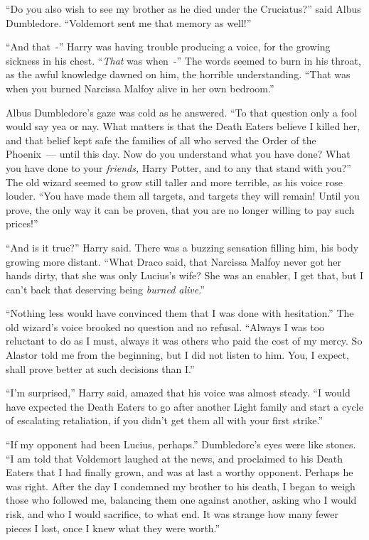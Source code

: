 ``Do you also wish to see my brother as he died under the Cruciatus?'' said Albus Dumbledore. ``Voldemort sent me that memory as well!''

``And that~-'' Harry was having trouble producing a voice, for the growing sickness in his chest. ``\emph{That} was when~-'' The words seemed to burn in his throat, as the awful knowledge dawned on him, the horrible understanding. ``That was when you burned Narcissa Malfoy alive in her own bedroom.''

Albus Dumbledore's gaze was cold as he answered. ``To that question only a fool would say yea or nay. What matters is that the Death Eaters believe I killed her, and that belief kept safe the families of all who served the Order of the Phoenix~--- until this day. Now do you understand what you have done? What you have done to your \emph{friends,} Harry Potter, and to any that stand with you?'' The old wizard seemed to grow still taller and more terrible, as his voice rose louder. ``You have made them all targets, and targets they will remain! Until you prove, the only way it can be proven, that you are no longer willing to pay such prices!''

``And is it true?'' Harry said. There was a buzzing sensation filling him, his body growing more distant. ``What Draco said, that Narcissa Malfoy never got her hands dirty, that she was only Lucius's wife? She was an enabler, I get that, but I can't back that deserving being \emph{burned alive}.''

``Nothing less would have convinced them that I was done with hesitation.'' The old wizard's voice brooked no question and no refusal. ``Always I was too reluctant to do as I must, always it was others who paid the cost of my mercy. So Alastor told me from the beginning, but I did not listen to him. You, I expect, shall prove better at such decisions than I.''

``I'm surprised,'' Harry said, amazed that his voice was almost steady. ``I would have expected the Death Eaters to go after another Light family and start a cycle of escalating retaliation, if you didn't get them all with your first strike.''

``If my opponent had been Lucius, perhaps.'' Dumbledore's eyes were like stones. ``I am told that Voldemort laughed at the news, and proclaimed to his Death Eaters that I had finally grown, and was at last a worthy opponent. Perhaps he was right. After the day I condemned my brother to his death, I began to weigh those who followed me, balancing them one against another, asking who I would risk, and who I would sacrifice, to what end. It was strange how many fewer pieces I lost, once I knew what they were worth.''

